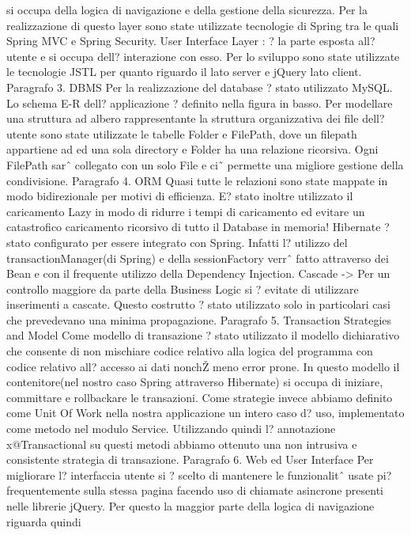 si occupa della logica di navigazione e della gestione della
sicurezza. Per la realizzazione di questo layer sono state utilizzate
tecnologie di Spring tra le quali Spring MVC e Spring Security. User
Interface Layer : ? la parte esposta all? utente e si occupa dell?
interazione con esso. Per lo sviluppo sono state utilizzate le
tecnologie JSTL per quanto riguardo il lato server e jQuery lato
client. Paragrafo 3. DBMS Per la realizzazione del database ? stato
utilizzato MySQL. Lo schema E-R dell? applicazione ? definito nella
figura in basso. Per modellare una struttura ad albero rappresentante
la struttura organizzativa dei file dell? utente sono state utilizzate
le tabelle Folder e FilePath, dove un filepath appartiene ad ed una
sola directory e Folder ha una relazione ricorsiva. Ogni FilePath sarˆ
collegato con un solo File e ci˜ permette una migliore gestione della
condivisione. Paragrafo 4. ORM Quasi tutte le relazioni sono state
mappate in modo bidirezionale per motivi di efficienza. E? stato
inoltre utilizzato il caricamento Lazy in modo di ridurre i tempi di
caricamento ed evitare un catastrofico caricamento ricorsivo di tutto
il Database in memoria! Hibernate ? stato configurato per essere
integrato con Spring. Infatti l? utilizzo del transactionManager(di
Spring) e della sessionFactory verrˆ fatto attraverso dei Bean e con
il frequente utilizzo della Dependency Injection. Cascade -> Per un
controllo maggiore da parte della Business Logic si ? evitate di
utilizzare inserimenti a cascate. Questo costrutto ? stato utilizzato
solo in particolari casi che prevedevano una minima
propagazione. Paragrafo 5. Transaction Strategies and Model Come
modello di transazione ? stato utilizzato il modello dichiarativo che
consente di non mischiare codice relativo alla logica del programma
con codice relativo all? accesso ai dati nonchŽ meno error prone. In
questo modello il contenitore(nel nostro caso Spring attraverso
Hibernate) si occupa di iniziare, committare e rollbackare le
transazioni. Come strategie invece abbiamo definito come Unit Of Work
nella nostra applicazione un intero caso d? uso, implementato come
metodo nel modulo Service. Utilizzando quindi l? annotazione
x@Transactional su questi metodi abbiamo ottenuto una non intrusiva e
consistente strategia di transazione. Paragrafo 6. Web ed User
Interface Per migliorare l? interfaccia utente si ? scelto di
mantenere le funzionalitˆ usate pi? frequentemente sulla stessa pagina
facendo uso di chiamate asincrone presenti nelle librerie jQuery. Per
questo la maggior parte della logica di navigazione riguarda quindi

